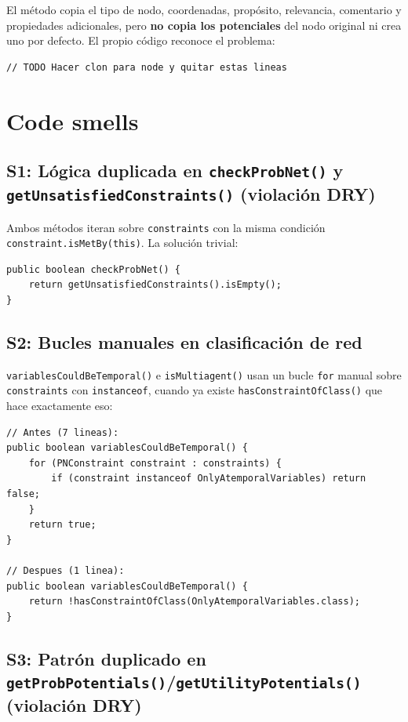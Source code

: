 \documentclass[11pt,a4paper]{article}
\newcommand{\code}[1]{\texttt{#1}}
\begin{document}
El m\'etodo copia el tipo de nodo, coordenadas, prop\'osito, relevancia,
comentario y propiedades adicionales, pero \textbf{no copia los
potenciales} del nodo original ni crea uno por defecto.  El propio
c\'odigo reconoce el problema:

\begin{lstlisting}
// TODO Hacer clon para node y quitar estas lineas
\end{lstlisting}

\section{Code smells}
\label{sec:smells}

\subsection{S1: L\'ogica duplicada en \code{checkProbNet()} y
            \code{getUnsatisfiedConstraints()} (violaci\'on DRY)}

Ambos m\'etodos iteran sobre \code{constraints} con la misma condici\'on
\code{constraint.isMetBy(this)}.  La soluci\'on trivial:

\begin{lstlisting}
public boolean checkProbNet() {
    return getUnsatisfiedConstraints().isEmpty();
}
\end{lstlisting}

\subsection{S2: Bucles manuales en clasificaci\'on de red}

\code{variablesCouldBeTemporal()} e \code{isMultiagent()} usan un bucle
\code{for} manual sobre \code{constraints} con \code{instanceof},
cuando ya existe \code{hasConstraintOfClass()} que hace exactamente
eso:

\begin{lstlisting}
// Antes (7 lineas):
public boolean variablesCouldBeTemporal() {
    for (PNConstraint constraint : constraints) {
        if (constraint instanceof OnlyAtemporalVariables) return false;
    }
    return true;
}

// Despues (1 linea):
public boolean variablesCouldBeTemporal() {
    return !hasConstraintOfClass(OnlyAtemporalVariables.class);
}
\end{lstlisting}

\subsection{S3: Patr\'on duplicado en
            \code{getProbPotentials()}/\code{getUtilityPotentials()} (violaci\'on DRY)}
\end{document}
